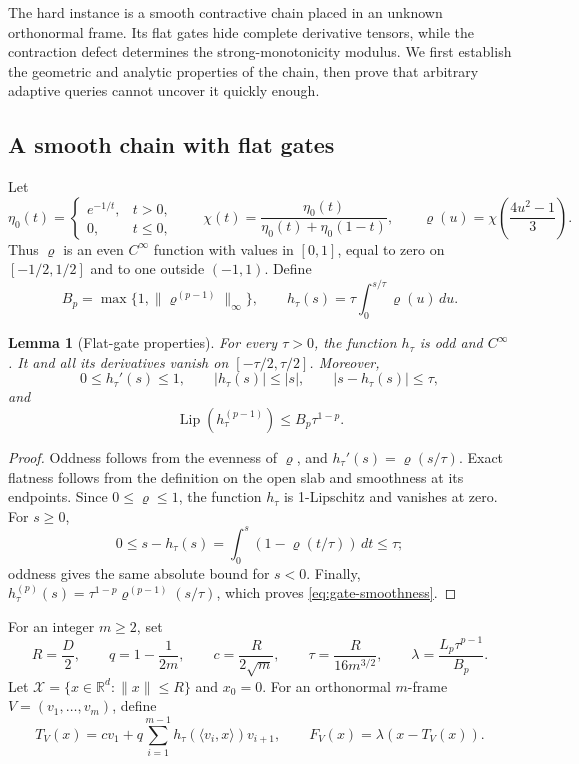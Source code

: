\documentclass[11pt]{article}
\numberwithin{equation}{section}
\newtheorem{lemma}[theorem]{Lemma}
\theoremstyle{definition}
\theoremstyle{remark}
\newcommand{\R}{\mathbb R}
\begin{document}
The hard instance is a smooth contractive chain placed in an unknown
orthonormal frame. Its flat gates hide complete derivative tensors, while
the contraction defect determines the strong-monotonicity modulus. We
first establish the geometric and analytic properties of the chain, then
prove that arbitrary adaptive queries cannot uncover it quickly enough.

\subsection{A smooth chain with flat gates}

Let
\[
\eta_0(t)=
\begin{cases}
e^{-1/t},&t>0,\\
0,&t\le0,
\end{cases}
\qquad
\chi(t)=\frac{\eta_0(t)}{\eta_0(t)+\eta_0(1-t)},
\qquad
\varrho(u)=\chi\!\left(\frac{4u^2-1}{3}\right).
\]
Thus $\varrho$ is an even $C^\infty$ function with values in $[0,1]$,
equal to zero on $[-1/2,1/2]$ and to one outside $(-1,1)$. Define
\begin{equation}\label{eq:flat-gate}
B_p=\max\{1,\|\varrho^{(p-1)}\|_\infty\},
\qquad
h_\tau(s)=\tau\int_0^{s/\tau}\varrho(u)\,du.
\end{equation}

\begin{lemma}[Flat-gate properties]\label{lem:flat-gate}
For every $\tau>0$, the function $h_\tau$ is odd and $C^\infty$.
It and all its derivatives vanish on $[-\tau/2,\tau/2]$. Moreover,
\[
0\le h_\tau'(s)\le1,
\qquad |h_\tau(s)|\le |s|,
\qquad |s-h_\tau(s)|\le\tau,
\]
and
\begin{equation}\label{eq:gate-smoothness}
\operatorname{Lip}(h_\tau^{(p-1)})
\le B_p\tau^{1-p}.
\end{equation}
\end{lemma}

\begin{proof}
Oddness follows from the evenness of $\varrho$, and
$h_\tau'(s)=\varrho(s/\tau)$. Exact flatness follows from the
definition on the open slab and smoothness at its endpoints.
Since $0\le\varrho\le1$, the function $h_\tau$ is 1-Lipschitz and
vanishes at zero. For $s\ge0$,
\[
0\le s-h_\tau(s)
=\int_0^s(1-\varrho(t/\tau))\,dt\le\tau;
\]
oddness gives the same absolute bound for $s<0$. Finally,
$h_\tau^{(p)}(s)=\tau^{1-p}\varrho^{(p-1)}(s/\tau)$, which proves
\eqref{eq:gate-smoothness}.
\end{proof}

For an integer $m\ge2$, set
\begin{equation}\label{eq:chain-parameters}
R=\frac D2,\qquad
q=1-\frac1{2m},\qquad
c=\frac{R}{2\sqrt m},\qquad
\tau=\frac{R}{16m^{3/2}},\qquad
\lambda=\frac{L_p\tau^{p-1}}{B_p}.
\end{equation}
Let $\mathcal X=\{x\in\R^d:\|x\|\le R\}$ and $x_0=0$.
For an orthonormal $m$-frame $V=(v_1,\ldots,v_m)$, define
\begin{equation}\label{eq:hard-family}
T_V(x)=cv_1+q\sum_{i=1}^{m-1}
h_\tau(\langle v_i,x\rangle)v_{i+1},
\qquad
F_V(x)=\lambda(x-T_V(x)).
\end{equation}
\end{document}
